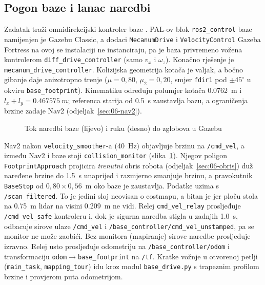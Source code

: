 \subsection{Pogon baze i lanac naredbi}
\label{sec:04-baza}

Zadatak traži omnidirekcijski kontroler baze \cite{mail2026}. PAL-ov blok \texttt{ros2\_control}
baze \cite{omnibase} namijenjen je Gazebu Classic, a dodaci \texttt{MecanumDrive} i
\texttt{VelocityControl} Gazeba Fortress na ovoj se instalaciji ne instanciraju, pa je baza
privremeno vožena kontrolerom \texttt{diff\_drive\_controller} (samo $v_x$ i $\omega_z$). Konačno
rješenje je \texttt{mecanum\_drive\_controller}. Kolizijska geometrija kotača je valjak, a bočno
gibanje daje anizotropno trenje ($\mu = 0{,}80$, $\mu_2 = 0{,}20$, smjer \texttt{fdir1} pod
$\pm45^\circ$ u okviru \texttt{base\_footprint}). Kinematiku određuju polumjer kotača
\SI{0.0762}{m} i $l_x + l_y = \SI{0.467575}{m}$; referenca starija od \SI{0.5}{s} zaustavlja
bazu, a ograničenja brzine zadaje Nav2 (odjeljak~\ref{sec:06-nav2}).

\begin{figure}[H]
  \centering
  
  \caption{Tok naredbi baze (lijevo) i ruku (desno) do zglobova u Gazebu}
  \label{fig:tok-naredbi}
\end{figure}

Nav2 nakon \texttt{velocity\_smoother}-a (40~Hz) objavljuje brzinu na \texttt{/cmd\_vel}, a
između Nav2 i baze stoji \texttt{collision\_monitor} (slika~\ref{fig:tok-naredbi}). Njegov
poligon \texttt{FootprintApproach} projicira \emph{trenutni} obris robota
(odjeljak~\ref{sec:06-obris}) duž naređene brzine do \SI{1.5}{s} unaprijed i razmjerno
smanjuje brzinu, a pravokutnik \texttt{BaseStop} od $0{,}80 \times 0{,}56$~m oko baze je
zaustavlja. Podatke uzima s \texttt{/scan\_filtered}. To je jedini sloj neovisan o costmapu, a
bitan je jer ploču stola na \SI{0.75}{m} lidar na visini \SI{0.209}{m} ne vidi. Relej
\texttt{cmd\_vel\_relay} prosljeđuje \texttt{/cmd\_vel\_safe} kontroleru i, dok je sigurna
naredba stigla u zadnjih \SI{1.0}{s}, odbacuje sirove ulaze \texttt{/cmd\_vel} i
\texttt{/base\_controller/cmd\_vel\_unstamped}, pa se monitor ne može zaobići. Bez monitora
(mapiranje) sirove naredbe prosljeđuje izravno. Relej usto prosljeđuje odometriju na
\texttt{/base\_controller/odom} i transformaciju \texttt{odom}$\rightarrow$\texttt{base\_footprint}
na \texttt{/tf}. Kratke vožnje u otvorenoj petlji (\texttt{main\_task}, \texttt{mapping\_tour})
idu kroz modul \texttt{base\_drive.py} s trapeznim profilom brzine i provjerom puta
odometrijom.

